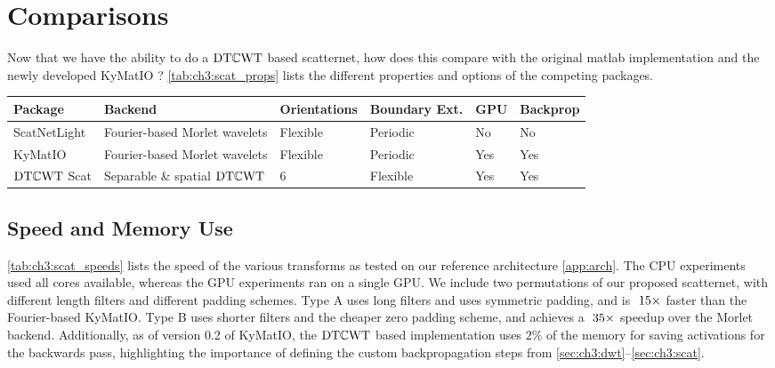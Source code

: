 \section{Comparisons}
Now that we have the ability to do a $\mathrm{DT}\mathbb{C}\mathrm{WT}$ based scatternet, how does this
compare with the original matlab implementation \cite{oyallon_deep_2015} and the newly developed
KyMatIO \cite{andreux_kymatio:_2018}? \autoref{tab:ch3:scat_props} lists the different properties and 
options of the competing packages. 

\begin{table}
  \centering
  {\renewcommand{\arraystretch}{1.2}%
  \begin{tabular}{@{}llllll}
    \toprule
    Package & Backend & Orientations & Boundary Ext. & GPU & Backprop \\\midrule
    ScatNetLight\cite{oyallon_deep_2015} & Fourier-based Morlet wavelets & Flexible & Periodic & No & No \\
    KyMatIO\cite{andreux_kymatio:_2018} & Fourier-based Morlet wavelets & Flexible & Periodic & Yes & Yes \\
    $\mathrm{DT}\mathbb{C}\mathrm{WT}$ Scat & Separable \& spatial $\mathrm{DT}\mathbb{C}\mathrm{WT}$ & 6 & Flexible & Yes & Yes \\
    \bottomrule
  \end{tabular}\label{tab:ch3:scat_props}
  }
\end{table}

\subsection{Speed and Memory Use}
\autoref{tab:ch3:scat_speeds} lists the speed of the various transforms as
tested on our reference architecture \autoref{app:arch}. The CPU experiments
used all cores available, whereas the GPU experiments ran on a single GPU\@. We
include two permutations of our proposed scatternet, with different length
filters and different padding schemes. Type A uses long filters and uses
symmetric padding, and is $~15\times$ faster than the Fourier-based KyMatIO\@. Type B
uses shorter filters and the cheaper zero padding scheme, and 
achieves a $~35\times$ speedup over the Morlet backend.
Additionally, as of version 0.2 of KyMatIO, the $\mathrm{DT}\mathbb{C}\mathrm{WT}$ based implementation
uses $2\%$ of the memory for saving activations for the
backwards pass, highlighting the importance of defining the custom
backpropagation steps from \autoref{sec:ch3:dwt}--\autoref{sec:ch3:scat}.

